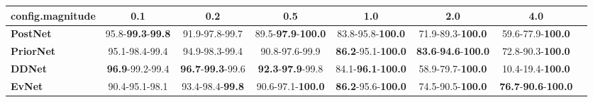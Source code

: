 \begin{tabular}{lccccccc}
\toprule
\textbf{config.magnitude} &                               0.1 &                               0.2 &                                0.5 &                                1.0 &                                         2.0 &                                         4.0 \\
\midrule
\textbf{PostNet } &  95.8-\textbf{99.3}-\textbf{99.8} &                    91.9-97.8-99.7 &  89.5-\textbf{97.9}-\textbf{100.0} &           83.8-95.8-\textbf{100.0} &                    71.9-89.3-\textbf{100.0} &                    59.6-77.9-\textbf{100.0} \\
\textbf{PriorNet} &                    95.1-98.4-99.4 &                    94.9-98.3-99.4 &                     90.8-97.6-99.9 &  \textbf{86.2}-95.1-\textbf{100.0} &  \textbf{83.6}-\textbf{94.6}-\textbf{100.0} &                    72.8-90.3-\textbf{100.0} \\
\textbf{DDNet   } &           \textbf{96.9}-99.2-99.4 &  \textbf{96.7}-\textbf{99.3}-99.6 &   \textbf{92.3}-\textbf{97.9}-99.8 &  84.1-\textbf{96.1}-\textbf{100.0} &                    58.9-79.7-\textbf{100.0} &                    10.4-19.4-\textbf{100.0} \\
\textbf{EvNet   } &                    90.4-95.1-98.1 &           93.4-98.4-\textbf{99.8} &           90.6-97.1-\textbf{100.0} &  \textbf{86.2}-95.6-\textbf{100.0} &                    74.5-90.5-\textbf{100.0} &  \textbf{76.7}-\textbf{90.6}-\textbf{100.0} \\
\bottomrule
\end{tabular}
